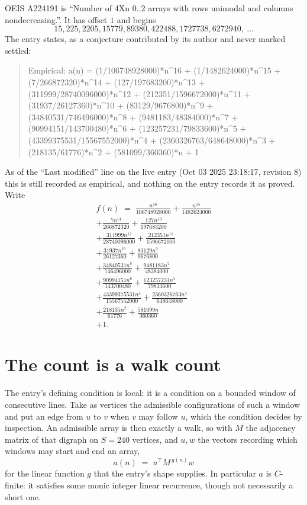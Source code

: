 \documentclass[11pt,a4paper]{article}
\theoremstyle{plain}
\theoremstyle{definition}
\begin{document}
OEIS A224191 is ``Number of 4Xn 0..2 arrays with rows unimodal and columns nondecreasing.''. It has offset $1$ and begins
\[
15, 225, 2205, 15779, 89380, 422488, 1727738, 6272940,\ \dots
\]
The entry states, as a conjecture contributed by its author and never marked settled:
\begin{quote}\raggedright\small
Empirical: a(n) = (1/106748928000)*n\^{}16 + (1/1482624000)*n\^{}15 + (7/266872320)*n\^{}14 + (127/197683200)*n\^{}13 + (311999/28740096000)*n\^{}12 + (212351/1596672000)*n\^{}11 + (31937/26127360)*n\^{}10 + (83129/9676800)*n\^{}9 + (34840531/746496000)*n\^{}8 + (9481183/48384000)*n\^{}7 + (90994151/143700480)*n\^{}6 + (123257231/79833600)*n\^{}5 + (43399375531/15567552000)*n\^{}4 + (2360326763/648648000)*n\^{}3 + (218135/61776)*n\^{}2 + (581099/360360)*n + 1
\end{quote}
As of the ``Last modified'' line on the live entry (Oct 03 2025 23:18:17, revision 8) this is still
recorded as empirical, and nothing on the entry records it as proved. Write
\begin{multline*}
f(n)\;=\;\frac{n^{16}}{106748928000} + \frac{n^{15}}{1482624000} \\
+ \frac{7 n^{14}}{266872320} + \frac{127 n^{13}}{197683200} \\
+ \frac{311999 n^{12}}{28740096000} + \frac{212351 n^{11}}{1596672000} \\
+ \frac{31937 n^{10}}{26127360} + \frac{83129 n^{9}}{9676800} \\
+ \frac{34840531 n^{8}}{746496000} + \frac{9481183 n^{7}}{48384000} \\
+ \frac{90994151 n^{6}}{143700480} + \frac{123257231 n^{5}}{79833600} \\
+ \frac{43399375531 n^{4}}{15567552000} + \frac{2360326763 n^{3}}{648648000} \\
+ \frac{218135 n^{2}}{61776} + \frac{581099 n}{360360} \\
+ 1.
\end{multline*}

\section{The count is a walk count}

The entry's defining condition is local: it is a condition on a bounded window of consecutive lines. Take as vertices the
admissible configurations of such a window and put an edge from $u$ to $v$ when $v$ may
follow $u$, which the condition decides by inspection. An admissible array is then exactly a
walk, so with $M$ the adjacency matrix of that digraph on $S=240$ vertices, and $u,w$ the
vectors recording which windows may start and end an array,
\[
a(n)\;=\;u^{\!\top}M^{\,g(n)}w
\]
for the linear function $g$ that the entry's shape supplies. In particular $a$ is
$C$-finite: it satisfies some monic integer linear recurrence, though not necessarily a short
one.
\end{document}
